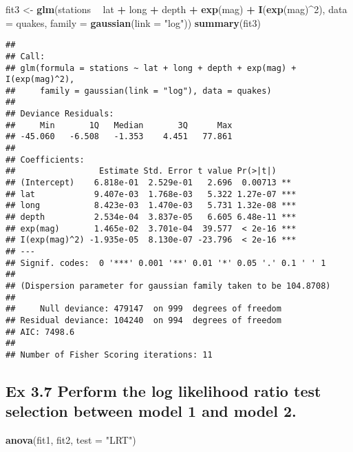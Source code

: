 \documentclass[
]{article}
\newenvironment{Shaded}{\begin{snugshade}}{\end{snugshade}}
\newcommand{\DataTypeTok}[1]{\textcolor[rgb]{0.13,0.29,0.53}{#1}}
\newcommand{\DecValTok}[1]{\textcolor[rgb]{0.00,0.00,0.81}{#1}}
\newcommand{\KeywordTok}[1]{\textcolor[rgb]{0.13,0.29,0.53}{\textbf{#1}}}
\newcommand{\NormalTok}[1]{#1}
\newcommand{\OperatorTok}[1]{\textcolor[rgb]{0.81,0.36,0.00}{\textbf{#1}}}
\newcommand{\StringTok}[1]{\textcolor[rgb]{0.31,0.60,0.02}{#1}}
\begin{document}
\begin{Shaded}
\begin{Highlighting}[]
\NormalTok{fit3 <-}\StringTok{ }\KeywordTok{glm}\NormalTok{(stations }\OperatorTok{~}\StringTok{ }\NormalTok{lat }\OperatorTok{+}\StringTok{ }\NormalTok{long }\OperatorTok{+}\StringTok{ }\NormalTok{depth }\OperatorTok{+}\StringTok{ }\KeywordTok{exp}\NormalTok{(mag) }\OperatorTok{+}\StringTok{ }
\StringTok{              }\KeywordTok{I}\NormalTok{(}\KeywordTok{exp}\NormalTok{(mag)}\OperatorTok{^}\DecValTok{2}\NormalTok{), }\DataTypeTok{data =}\NormalTok{ quakes, }\DataTypeTok{family =} \KeywordTok{gaussian}\NormalTok{(}\DataTypeTok{link =} \StringTok{"log"}\NormalTok{))}
\KeywordTok{summary}\NormalTok{(fit3)}
\end{Highlighting}
\end{Shaded}

\begin{verbatim}
## 
## Call:
## glm(formula = stations ~ lat + long + depth + exp(mag) + I(exp(mag)^2), 
##     family = gaussian(link = "log"), data = quakes)
## 
## Deviance Residuals: 
##     Min       1Q   Median       3Q      Max  
## -45.060   -6.508   -1.353    4.451   77.861  
## 
## Coefficients:
##                 Estimate Std. Error t value Pr(>|t|)    
## (Intercept)    6.818e-01  2.529e-01   2.696  0.00713 ** 
## lat            9.407e-03  1.768e-03   5.322 1.27e-07 ***
## long           8.423e-03  1.470e-03   5.731 1.32e-08 ***
## depth          2.534e-04  3.837e-05   6.605 6.48e-11 ***
## exp(mag)       1.465e-02  3.701e-04  39.577  < 2e-16 ***
## I(exp(mag)^2) -1.935e-05  8.130e-07 -23.796  < 2e-16 ***
## ---
## Signif. codes:  0 '***' 0.001 '**' 0.01 '*' 0.05 '.' 0.1 ' ' 1
## 
## (Dispersion parameter for gaussian family taken to be 104.8708)
## 
##     Null deviance: 479147  on 999  degrees of freedom
## Residual deviance: 104240  on 994  degrees of freedom
## AIC: 7498.6
## 
## Number of Fisher Scoring iterations: 11
\end{verbatim}

\hypertarget{ex-3.7-perform-the-log-likelihood-ratio-test-selection-between-model-1-and-model-2.}{%
\subsection{Ex 3.7 Perform the log likelihood ratio test selection
between model 1 and model
2.}\label{ex-3.7-perform-the-log-likelihood-ratio-test-selection-between-model-1-and-model-2.}}

\begin{Shaded}
\begin{Highlighting}[]
\KeywordTok{anova}\NormalTok{(fit1, fit2, }\DataTypeTok{test =} \StringTok{"LRT"}\NormalTok{)}
\end{Highlighting}
\end{Shaded}
\end{document}
